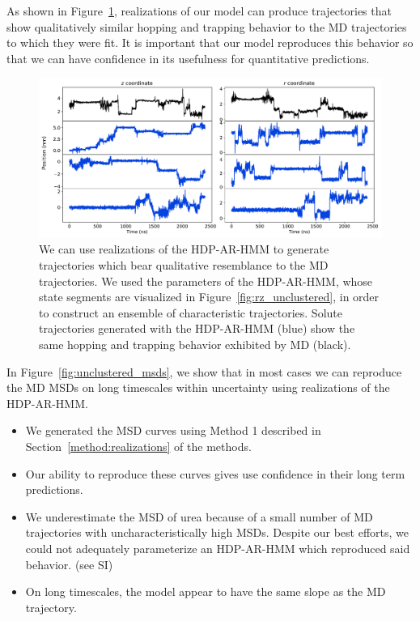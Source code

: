 \documentclass[journal=jpcbfk,manuscript=article]{achemso}
\begin{document}
  As shown in Figure~\ref{fig:qualitative_unclustered}, realizations of our model 
  can produce trajectories that show qualitatively similar hopping and trapping 
  behavior to the MD trajectories to which they were fit. It is important that our
  model reproduces this behavior so that we can have confidence in its usefulness
  for quantitative predictions.
  
  \begin{figure}
  \centering
  \includegraphics[width=\textwidth]{qualitative_unclustered_MET2.pdf}
  \caption{We can use realizations of the HDP-AR-HMM to generate trajectories which 
  bear qualitative resemblance to the MD trajectories. We used the parameters 
  of the HDP-AR-HMM, whose state segments are visualized in 
  Figure~\ref{fig:rz_unclustered}, in order to construct an ensemble of 
  characteristic trajectories. Solute trajectories generated with
  the HDP-AR-HMM (blue) show the same hopping and trapping behavior exhibited by 
  MD (black).
  }\label{fig:qualitative_unclustered}
  \end{figure}
  
  In Figure~\ref{fig:unclustered_msds}, we show that in most cases we can reproduce the 
  MD MSDs on long timescales within uncertainty using realizations of the 
  HDP-AR-HMM.
  \begin{itemize}
    \item We generated the MSD curves using Method 1 described in 
    Section~\ref{method:realizations} of the methods.
    \item Our ability to reproduce these curves gives use confidence
    in their long term predictions.
    \item We underestimate the MSD of urea because of a small number of MD 
    trajectories with uncharacteristically high MSDs. Despite our best efforts, 
    we could not adequately parameterize an HDP-AR-HMM which reproduced said 
    behavior. (see SI)  %
    \item On long timescales, the model appear to have the same slope as 
    the MD trajectory.
  \end{itemize}
  
\end{document}
